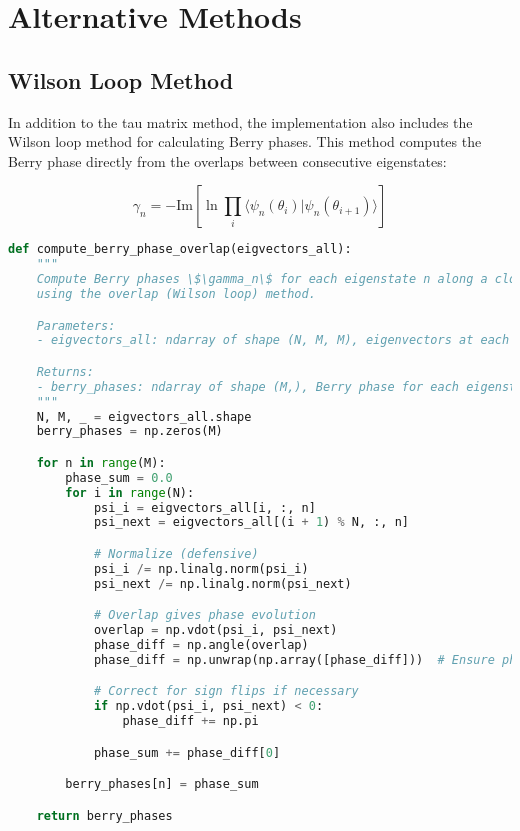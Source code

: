 \documentclass{article}
\begin{document}
\section{Alternative Methods}

\subsection{Wilson Loop Method}

In addition to the tau matrix method, the implementation also includes the Wilson loop method for calculating Berry phases. This method computes the Berry phase directly from the overlaps between consecutive eigenstates:

\begin{equation}
\gamma_n = -\text{Im}\left[\ln \prod_i \langle \psi_n(\theta_i) | \psi_n(\theta_{i+1}) \rangle\right]
\end{equation}

\begin{lstlisting}[language=Python, caption=Implementation of the Wilson loop method for Berry phase calculation]
def compute_berry_phase_overlap(eigvectors_all):
    """
    Compute Berry phases \$\gamma_n\$ for each eigenstate n along a closed path in R-space,
    using the overlap (Wilson loop) method.

    Parameters:
    - eigvectors_all: ndarray of shape (N, M, M), eigenvectors at each \$\theta\$

    Returns:
    - berry_phases: ndarray of shape (M,), Berry phase for each eigenstate in radians
    """
    N, M, _ = eigvectors_all.shape
    berry_phases = np.zeros(M)

    for n in range(M):
        phase_sum = 0.0
        for i in range(N):
            psi_i = eigvectors_all[i, :, n]
            psi_next = eigvectors_all[(i + 1) % N, :, n]

            # Normalize (defensive)
            psi_i /= np.linalg.norm(psi_i)
            psi_next /= np.linalg.norm(psi_next)

            # Overlap gives phase evolution
            overlap = np.vdot(psi_i, psi_next)
            phase_diff = np.angle(overlap)
            phase_diff = np.unwrap(np.array([phase_diff]))  # Ensure phase is continuous

            # Correct for sign flips if necessary
            if np.vdot(psi_i, psi_next) < 0:
                phase_diff += np.pi

            phase_sum += phase_diff[0]

        berry_phases[n] = phase_sum

    return berry_phases
\end{lstlisting}
\end{document}
